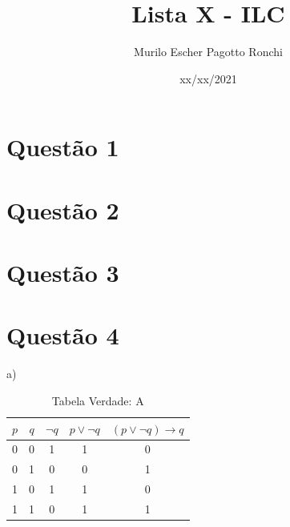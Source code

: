 \documentclass[a4paper, 12pt]{article}
\title{Lista X - ILC}
\date{xx/xx/2021}
\author{Murilo Escher Pagotto Ronchi}
\begin{document}
    \maketitle
    \newpage
    \section*{Questão 1}

    \section*{Questão 2}

    \section*{Questão 3}

    \section*{Questão 4}
        a) \par 
           \begin{table}[htb]
               \begin{center}
                   \caption*{Tabela Verdade: A}
                  \begin{tabular}{c|c|c|c|c}
                      \textbf{$p$} & \textbf{$q$} & \textbf{$\neg
                      q$} & \textbf{$p \lor \neg q$} &
                      \textbf{$(p \lor \neg q) \to q$}\\
                      \hline
                      0 & 0 & 1 & 1 & 0\\
                      0 & 1 & 0 & 0 & 1\\
                      1 & 0 & 1 & 1 & 0\\
                      1 & 1 & 0 & 1 & 1\\
                  \end{tabular}
               \end{center}
           \end{table}
\end{document}

